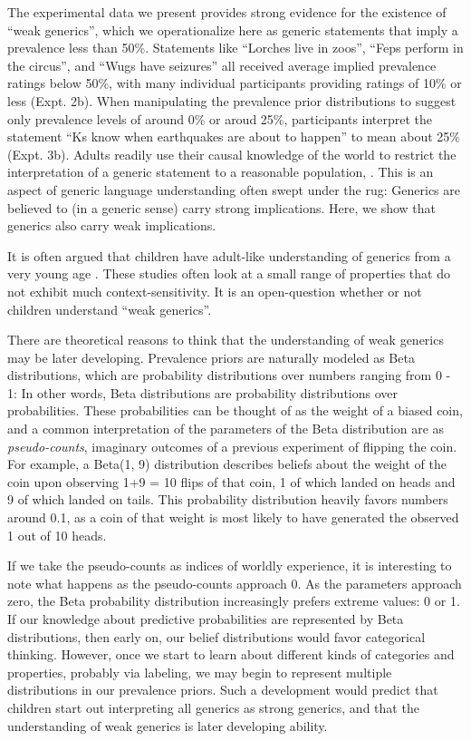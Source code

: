 \documentclass[floatsintext,doc]{apa6}
\theoremstyle{definition}
\theoremstyle{definition}
\theoremstyle{definition}
\theoremstyle{remark}
\begin{document}
The experimental data we present provides strong evidence for the
existence of \enquote{weak generics}, which we operationalize here as
generic statements that imply a prevalence less than 50\%. Statements
like \enquote{Lorches live in zoos}, \enquote{Feps perform in the
circus}, and \enquote{Wugs have seizures} all received average implied
prevalence ratings below 50\%, with many individual participants
providing ratings of 10\% or less (Expt. 2b). When manipulating the
prevalence prior distributions to suggest only prevalence levels of
around 0\% or aroud 25\%, participants interpret the statement
\enquote{Ks know when earthquakes are about to happen} to mean about
25\% (Expt. 3b). Adults readily use their causal knowledge of the world
to restrict the interpretation of a generic statement to a reasonable
population, . This is an aspect
of generic language understanding often swept under the rug: Generics
are believed to (in a generic sense) carry strong implications. Here, we
show that generics also carry weak implications.

It is often argued that children have adult-like understanding of
generics from a very young age
. These studies often look
at a small range of properties that do not exhibit much
context-sensitivity. It is an open-question whether or not children
understand \enquote{weak generics}.

There are theoretical reasons to think that the understanding of weak
generics may be later developing. Prevalence priors are naturally
modeled as Beta distributions, which are probability distributions over
numbers ranging from 0 - 1: In other words, Beta distributions are
probability distributions over probabilities. These probabilities can be
thought of as the weight of a biased coin, and a common interpretation
of the parameters of the Beta distribution are as \emph{pseudo-counts},
imaginary outcomes of a previous experiment of flipping the coin. For
example, a Beta(1, 9) distribution describes beliefs about the weight of
the coin upon observing 1+9 = 10 flips of that coin, 1 of which landed
on heads and 9 of which landed on tails. This probability distribution
heavily favors numbers around 0.1, as a coin of that weight is most
likely to have generated the observed 1 out of 10 heads.

If we take the pseudo-counts as indices of worldly experience, it is
interesting to note what happens as the pseudo-counts approach 0. As the
parameters approach zero, the Beta probability distribution increasingly
prefers extreme values: 0 or 1. If our knowledge about predictive
probabilities are represented by Beta distributions, then early on, our
belief distributions would favor categorical thinking. However, once we
start to learn about different kinds of categories and properties,
probably via labeling, we may begin to represent multiple distributions
in our prevalence priors. Such a development would predict that children
start out interpreting all generics as strong generics, and that the
understanding of weak generics is later developing ability.
\end{document}

